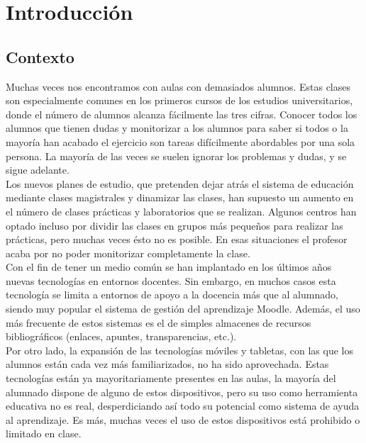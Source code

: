 
\pagestyle{fancy}

\chapter{Introducción}
\label{introduccion}

\section{Contexto}

Muchas veces nos encontramos con aulas con demasiados alumnos. Estas clases son especialmente comunes en los primeros cursos de los estudios universitarios, donde el número de alumnos alcanza fácilmente las tres cifras. Conocer todos los alumnos que tienen dudas y monitorizar a los alumnos para saber si todos o la mayoría han acabado el ejercicio son tareas difícilmente abordables por una sola persona. La mayoría de las veces se suelen ignorar los problemas y dudas, y se sigue adelante.\\

Los nuevos planes de estudio, que pretenden dejar atrás el sistema de educación mediante clases magistrales y dinamizar las clases, han supuesto un aumento en el número de clases prácticas y laboratorios que se realizan. Algunos centros han optado incluso por dividir las clases en grupos más pequeños para realizar las prácticas, pero muchas veces ésto no es posible. En esas situaciones el profesor acaba por no poder monitorizar completamente la clase.\\

Con el fin de tener un medio común se han implantado en los últimos años nuevas tecnologías en entornos docentes. Sin embargo, en muchos casos esta tecnología se limita a entornos de apoyo a la docencia más que al alumnado, siendo muy popular el sistema de gestión del aprendizaje Moodle. Además, el uso más frecuente de estos sistemas es el de simples almacenes de recursos bibliográficos (enlaces, apuntes, transparencias, etc.).\\

Por otro lado, la expansión de las tecnologías móviles y tabletas, con las que los alumnos están cada vez más familiarizados, no ha sido aprovechada. Estas tecnologías están ya mayoritariamente presentes en las aulas, la mayoría del alumnado dispone de alguno de estos dispositivos, pero su uso como herramienta educativa no es real, desperdiciando así todo su potencial como sistema de ayuda al aprendizaje. Es más, muchas veces el uso de estos dispositivos está prohibido o limitado en clase.\\

